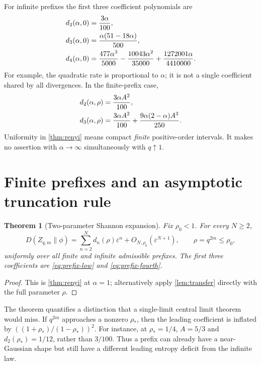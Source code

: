 \documentclass[11pt,a4paper]{article}
\numberwithin{equation}{section}
\newtheorem{theorem}{Theorem}[section]
\theoremstyle{definition}
\theoremstyle{remark}
\newcommand{\eps}{\varepsilon}
\begin{document}
For infinite prefixes the first three coefficient polynomials are
\begin{align}
 d_2(\alpha,0)&=\frac{3\alpha}{100},\label{eq:renyi-low}\\
 d_3(\alpha,0)&=\frac{\alpha(51-18\alpha)}{500},\notag\\
 d_4(\alpha,0)&=\frac{477\alpha^3}{5000}
  -\frac{10043\alpha^2}{35000}
  +\frac{1272001\alpha}{4410000}.
 \label{eq:renyi-fourth}
\end{align}
For example, the quadratic rate is proportional to $\alpha$; it is not a
single coefficient shared by all divergences. In the finite-prefix case,
\begin{align}
 d_2(\alpha,\rho)&=\frac{3\alpha A^2}{100},\notag\\
 d_3(\alpha,\rho)&=\frac{3\alpha A^2}{100}
  +\frac{9\alpha(2-\alpha)A^3}{250}.
 \label{eq:renyi-prefix-low}
\end{align}
Uniformity in \cref{thm:renyi} means compact \emph{finite} positive-order
intervals. It makes no assertion with $\alpha\to\infty$ simultaneously with
$q\uparrow1$.

\section{Finite prefixes and an asymptotic truncation rule}
\label{sec:prefix}

\begin{theorem}[Two-parameter Shannon expansion]
\label{thm:prefix}
Fix $\rho_0<1$. For every $N\ge2$,
\begin{equation}
 D(Z_{q,m}\|\phi)=\sum_{n=2}^{N}d_n(\rho)\eps^n
                  +O_{N,\rho_0}(\eps^{N+1}),
 \qquad \rho=q^{2m}\le\rho_0,
 \label{eq:prefix-expansion}
\end{equation}
uniformly over all finite and infinite admissible prefixes. The first three
coefficients are \eqref{eq:prefix-low} and \eqref{eq:prefix-fourth}.
\end{theorem}
\begin{proof}
This is \cref{thm:renyi} at $\alpha=1$; alternatively apply
\cref{lem:transfer} directly with the full parameter $\rho$.
\end{proof}

The theorem quantifies a distinction that a single-limit central limit theorem
would miss. If $q^{2m}$ approaches a nonzero $\rho_*$, then the leading
coefficient is inflated by
$((1+\rho_*)/(1-\rho_*))^2$. For instance, at $\rho_*=1/4$,
$A=5/3$ and $d_2(\rho_*)=1/12$, rather than $3/100$.
Thus a prefix can already have a near-Gaussian shape but still have a different
leading entropy deficit from the infinite law.
\end{document}
